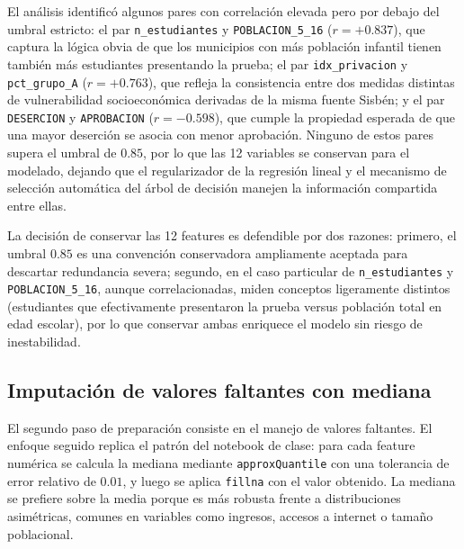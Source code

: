 El análisis identificó algunos pares con correlación elevada pero por debajo del umbral estricto: el par \texttt{n\_estudiantes} y \texttt{POBLACION\_5\_16} ($r = +0.837$), que captura la lógica obvia de que los municipios con más población infantil tienen también más estudiantes presentando la prueba; el par \texttt{idx\_privacion} y \texttt{pct\_grupo\_A} ($r = +0.763$), que refleja la consistencia entre dos medidas distintas de vulnerabilidad socioeconómica derivadas de la misma fuente Sisbén; y el par \texttt{DESERCION} y \texttt{APROBACION} ($r = -0.598$), que cumple la propiedad esperada de que una mayor deserción se asocia con menor aprobación. Ninguno de estos pares supera el umbral de $0.85$, por lo que las 12 variables se conservan para el modelado, dejando que el regularizador de la regresión lineal y el mecanismo de selección automática del árbol de decisión manejen la información compartida entre ellas.

La decisión de conservar las 12 features es defendible por dos razones: primero, el umbral $0.85$ es una convención conservadora ampliamente aceptada para descartar redundancia severa; segundo, en el caso particular de \texttt{n\_estudiantes} y \texttt{POBLACION\_5\_16}, aunque correlacionadas, miden conceptos ligeramente distintos (estudiantes que efectivamente presentaron la prueba versus población total en edad escolar), por lo que conservar ambas enriquece el modelo sin riesgo de inestabilidad.

\subsection{Imputación de valores faltantes con mediana}
El segundo paso de preparación consiste en el manejo de valores faltantes. El enfoque seguido replica el patrón del notebook de clase: para cada feature numérica se calcula la mediana mediante \texttt{approxQuantile} con una tolerancia de error relativo de $0.01$, y luego se aplica \texttt{fillna} con el valor obtenido. La mediana se prefiere sobre la media porque es más robusta frente a distribuciones asimétricas, comunes en variables como ingresos, accesos a internet o tamaño poblacional.

